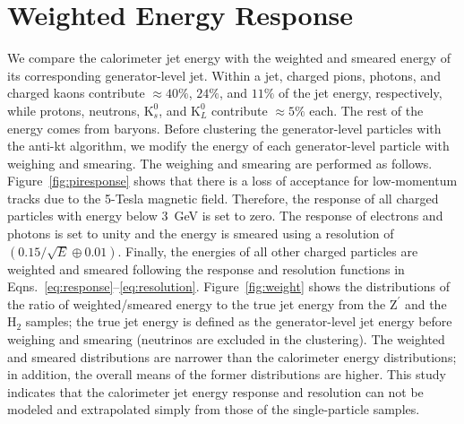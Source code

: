\documentclass{PoS}
\begin{document}
\section{Weighted Energy Response \label{sec:weight}}
We compare the calorimeter jet energy with the weighted 
and smeared energy of its corresponding generator-level jet. 
Within a jet, charged pions, photons, and charged kaons 
contribute $\approx 40\%$, $24\%$, and $11\%$ of the jet energy, respectively, 
while protons, neutrons, $\mathrm{K}_{s}^0$, and $\mathrm{K}_{L}^0$ contribute 
$\approx 5\%$ each. The rest of the energy comes from baryons. 
Before clustering the generator-level particles with the anti-kt algorithm, 
we modify the energy of each generator-level particle with weighing and 
smearing. The weighing and smearing are performed as follows. 
Figure~\ref{fig:piresponse} shows that there is a 
loss of acceptance for low-momentum tracks due to the 5-Tesla magnetic field. 
Therefore, the response of all charged particles with energy below 3~GeV is 
set to zero. The response of electrons and photons 
is set to unity and the energy is smeared using a resolution 
of $\left(0.15/\sqrt{E} \oplus 0.01\right)$. Finally, the energies
of all other charged particles are weighted and smeared 
following the response and resolution functions in 
Eqns.~\ref{eq:response}--\ref{eq:resolution}. 
%
Figure~\ref{fig:weight} shows the distributions of the ratio of 
weighted/smeared energy to the true jet energy from the $\mathrm{Z}^{\prime}$ 
and the $\mathrm{H}_2$ samples; the true jet energy is defined as the 
generator-level jet energy before weighing and smearing (neutrinos are 
excluded in the clustering). The weighted and smeared distributions are 
narrower than the calorimeter energy distributions; in addition, the overall 
means of the former distributions are higher. This study indicates that the 
calorimeter jet energy response and resolution can not be modeled and 
extrapolated simply from those of the single-particle samples.

\end{document}
